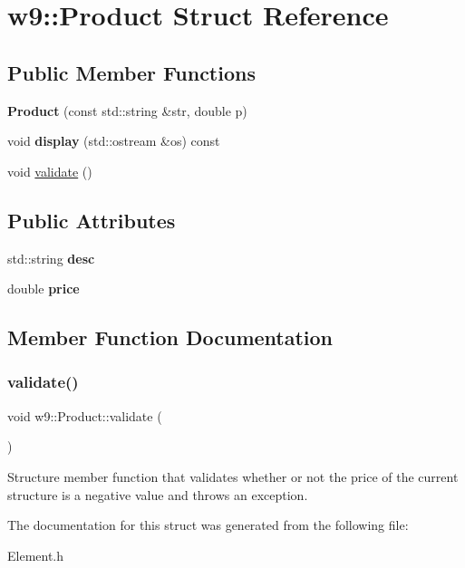 \hypertarget{structw9_1_1Product}{}\section{w9\+:\+:Product Struct Reference}
\label{structw9_1_1Product}
\subsection*{Public Member Functions}
\begin{DoxyCompactItemize}
\item 
\mbox{\label{structw9_1_1Product_a84f5ac58eb71d1db86742a769c607882}} 
{\bfseries Product} (const std\+::string \&str, double p)
\item 
\mbox{\label{structw9_1_1Product_a673bba86fc6f6177b13b9e67339ca205}} 
void {\bfseries display} (std\+::ostream \&os) const
\item 
void \mbox{\hyperlink{structw9_1_1Product_ad4acc6dc9611ea9e7141a1d419dea73e}{validate}} ()
\end{DoxyCompactItemize}
\subsection*{Public Attributes}
\begin{DoxyCompactItemize}
\item 
\mbox{\label{structw9_1_1Product_aae501e61f35dbbe6ec81c80a195f19d9}} 
std\+::string {\bfseries desc}
\item 
\mbox{\label{structw9_1_1Product_a314e23f7832114bd70eaa8c59b24be9d}} 
double {\bfseries price}
\end{DoxyCompactItemize}


\subsection{Member Function Documentation}
\mbox{\label{structw9_1_1Product_ad4acc6dc9611ea9e7141a1d419dea73e}} 
\subsubsection{\texorpdfstring{validate()}{validate()}}
{\footnotesize\ttfamily void w9\+::\+Product\+::validate (\begin{DoxyParamCaption}{ }\end{DoxyParamCaption})\hspace{0.3cm}{\ttfamily [inline]}}

Structure member function that validates whether or not the price of the current structure is a negative value and throws an exception. 

The documentation for this struct was generated from the following file\+:\begin{DoxyCompactItemize}
\item 
Element.\+h\end{DoxyCompactItemize}

